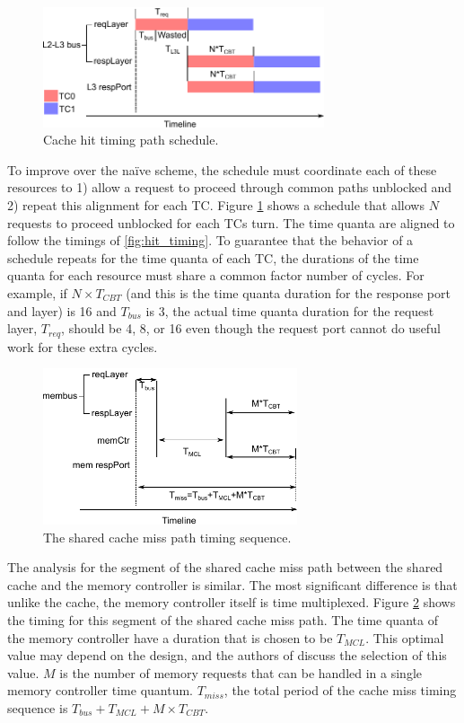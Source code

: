 \begin{figure}
    \begin{center}
        \includegraphics[width=3.2624in]{figs/hit_schedule.pdf}
        \caption{Cache hit timing path schedule.}
        \label{fig:hit_schedule}
    \end{center}
\end{figure}

To improve over the naïve scheme, the schedule must coordinate each of these 
resources to 1) allow a request to proceed through common paths unblocked and 
2) repeat this alignment for each TC. Figure \ref{fig:hit_schedule} shows a 
schedule that allows $N$ requests to proceed unblocked for each TCs turn. The 
time quanta are aligned to follow the timings of \ref{fig:hit_timing}. To 
guarantee that the behavior of a schedule repeats for the time quanta of each 
TC, the durations of the time quanta for each resource must share a common 
factor number of cycles. For example, if $N \times T_{CBT}$ (and this is the 
time quanta duration for the response port and layer) is 16 and $T_{bus}$ is 3, 
the actual time quanta duration for the request layer, $T_{req}$, should be 4, 
8, or 16 even though the request port cannot do useful work for these extra 
cycles. 

\begin{figure}
    \begin{center}
        \includegraphics[width=2.9475in]{figs/miss_timing.pdf}
        \caption{The shared cache miss path timing sequence.}
        \label{fig:miss_timing}
    \end{center}
\end{figure}

The analysis for the segment of the shared cache miss path between the shared 
cache and the memory controller is similar. The most significant difference is 
that unlike the cache, the memory controller itself is time multiplexed. Figure 
\ref{fig:miss_timing} shows the timing for this segment of the shared cache 
miss path. The time quanta of the memory controller have a duration that is 
chosen to be $T_{MCL}$. This optimal value may depend on the design, and
the authors of \cite{ushpca14} discuss the selection of this value. $M$ is the 
number of memory requests that can be handled in a single memory controller 
time quantum.
$T_{miss}$, the total period of the cache miss timing sequence is 
$T_{bus}+T_{MCL}+M\times T_{CBT}$.

